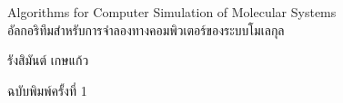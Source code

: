 

{
\thispagestyle{empty}

\begin{flushright}
    \vspace*{1.0in}
    
    \begin{spacing}{3}
    {\Huge Algorithms for Computer Simulation of Molecular Systems}\\
    {\LARGE อัลกอริทึมสำหรับการจำลองทางคอมพิวเตอร์ของระบบโมเลกุล}
    \end{spacing}
    
    \vspace{1.0in}
    
    {\LARGE  รังสิมันต์ เกษแก้ว}
    
    \vspace{1.5in}
    
    {\LARGE ฉบับพิมพ์ครั้งที่ 1}
    \vspace{0.5in}
    
    \vfill
\end{flushright}
}
